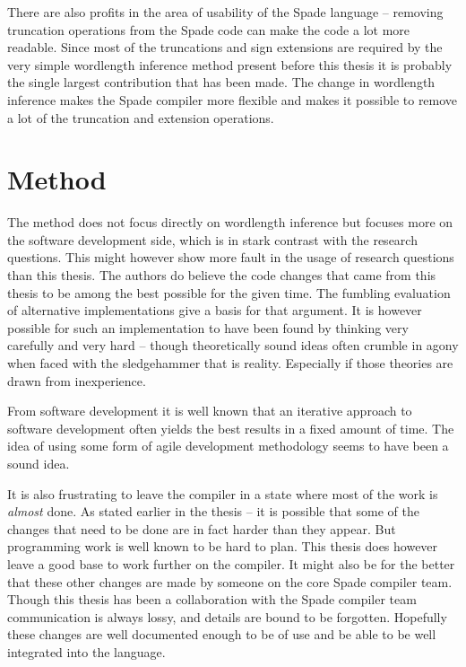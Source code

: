 There are also profits in the area of usability of the Spade language -- removing truncation operations from the Spade code can make the code a lot more readable. Since most of the truncations and sign extensions are required by the very simple wordlength inference method present before this thesis it is probably the single largest contribution that has been made. The change in wordlength inference makes the Spade compiler more flexible and makes it possible to remove a lot of the truncation and extension operations.

\section{Method}
The method does not focus directly on wordlength inference but focuses more on the software development side, which is in stark contrast with the research questions. This might however show more fault in the usage of research questions than this thesis. The authors do believe the code changes that came from this thesis to be among the best possible for the given time. The fumbling evaluation of alternative implementations give a basis for that argument. It is however possible for such an implementation to have been found by thinking very carefully and very hard -- though theoretically sound ideas often crumble in agony when faced with the sledgehammer that is reality. Especially if those theories are drawn from inexperience.

From software development it is well known that an iterative approach to software development often yields the best results in a fixed amount of time. The idea of using some form of agile development methodology seems to have been a sound idea.

It is also frustrating to leave the compiler in a state where most of the work is \textit{almost} done. As stated earlier in the thesis -- it is possible that some of the changes that need to be done are in fact harder than they appear. But programming work is well known to be hard to plan. This thesis does however leave a good base to work further on the compiler. It might also be for the better that these other changes are made by someone on the core Spade compiler team. Though this thesis has been a collaboration with the Spade compiler team communication is always lossy, and details are bound to be forgotten. Hopefully these changes are well documented enough to be of use and be able to be well integrated into the language.

